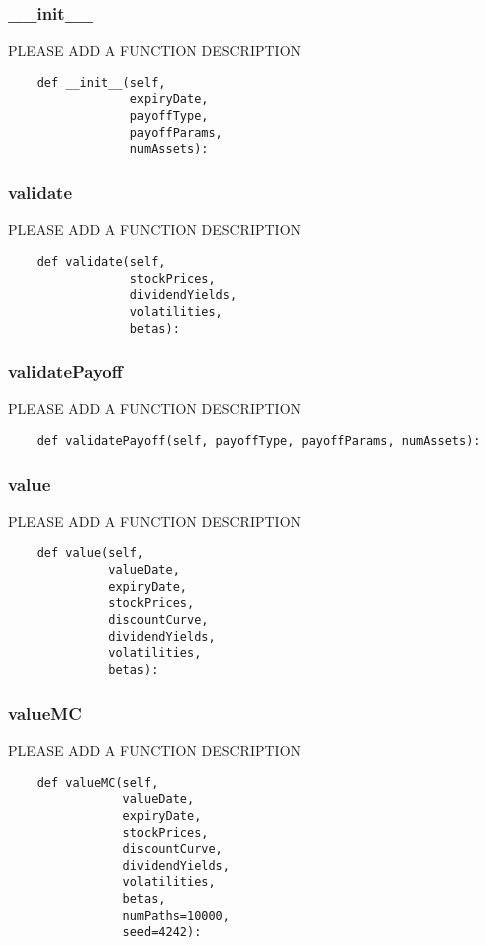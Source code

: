 \documentclass[twoside,11pt]{book}
\begin{document}
\subsubsection*{{\bf \_\_init\_\_}}
PLEASE ADD A FUNCTION DESCRIPTION

\begin{lstlisting}
    def __init__(self,
                 expiryDate,
                 payoffType,
                 payoffParams,
                 numAssets):
\end{lstlisting}

\subsubsection*{{\bf validate}}
PLEASE ADD A FUNCTION DESCRIPTION

\begin{lstlisting}
    def validate(self,
                 stockPrices,
                 dividendYields,
                 volatilities,
                 betas):
\end{lstlisting}

\subsubsection*{{\bf validatePayoff}}
PLEASE ADD A FUNCTION DESCRIPTION

\begin{lstlisting}
    def validatePayoff(self, payoffType, payoffParams, numAssets):
\end{lstlisting}

\subsubsection*{{\bf value}}
PLEASE ADD A FUNCTION DESCRIPTION

\begin{lstlisting}
    def value(self, 
              valueDate, 
              expiryDate, 
              stockPrices, 
              discountCurve,
              dividendYields, 
              volatilities, 
              betas):
\end{lstlisting}

\subsubsection*{{\bf valueMC}}
PLEASE ADD A FUNCTION DESCRIPTION

\begin{lstlisting}
    def valueMC(self,
                valueDate,
                expiryDate,
                stockPrices,
                discountCurve,
                dividendYields,
                volatilities,
                betas,
                numPaths=10000,
                seed=4242):
\end{lstlisting}
\end{document}
